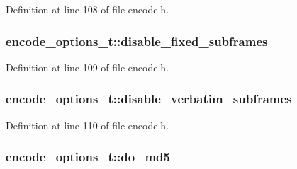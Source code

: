 Definition at line 108 of file encode.\+h.

\subsubsection[{\texorpdfstring{disable\+\_\+fixed\+\_\+subframes}{disable_fixed_subframes}}]{ encode\+\_\+options\+\_\+t\+::disable\+\_\+fixed\+\_\+subframes}\hypertarget{structencode__options__t_aa1e44d2272d814b18cc5730e7cd6c174}{}\label{structencode__options__t_aa1e44d2272d814b18cc5730e7cd6c174}


Definition at line 109 of file encode.\+h.

\subsubsection[{\texorpdfstring{disable\+\_\+verbatim\+\_\+subframes}{disable_verbatim_subframes}}]{ encode\+\_\+options\+\_\+t\+::disable\+\_\+verbatim\+\_\+subframes}\hypertarget{structencode__options__t_a9e40979f37bb09a72e11d60a5853902f}{}\label{structencode__options__t_a9e40979f37bb09a72e11d60a5853902f}


Definition at line 110 of file encode.\+h.

\subsubsection[{\texorpdfstring{do\+\_\+md5}{do_md5}}]{ encode\+\_\+options\+\_\+t\+::do\+\_\+md5}\hypertarget{structencode__options__t_ad9a47f807a48f0d4e302f732cc9cf651}{}\label{structencode__options__t_ad9a47f807a48f0d4e302f732cc9cf651}


